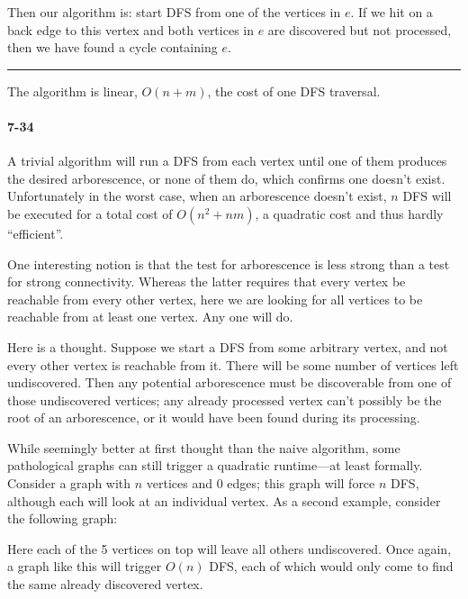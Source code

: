 \documentclass{report}
\newcommand{\okthen}{\rule[-1.4pt]{0.3em}{0.77em}}
\begin{document}
Then our algorithm is: start DFS from one of the vertices in $e$. If we hit on a back edge to this vertex and both vertices in $e$ are discovered but not processed, then we have found a cycle containing $e$.\ \okthen

The algorithm is linear, $O(n+m)$, the cost of one DFS traversal.

\paragraph{7-34} A trivial algorithm will run a DFS from each vertex until one of them produces the desired arborescence, or none of them do, which confirms one doesn't exist. Unfortunately in the worst case, when an arborescence doesn't exist, $n$ DFS will be executed for a total cost of $O(n^2+nm)$, a quadratic cost and thus hardly ``efficient''.

One interesting notion is that the test for arborescence is less strong than a test for strong connectivity. Whereas the latter requires that every vertex be reachable from every other vertex, here we are looking for all vertices to be reachable from at least one vertex. Any one will do.

Here is a thought. Suppose we start a DFS from some arbitrary vertex, and not every other vertex is reachable from it. There will be some number of vertices left undiscovered. Then any potential arborescence must be discoverable from one of those undiscovered vertices; any already processed vertex can't possibly be the root of an arborescence, or it would have been found during its processing.

While seemingly better at first thought than the naive algorithm, some pathological graphs can still trigger a quadratic runtime---at least formally. Consider a graph with $n$ vertices and 0 edges; this graph will force $n$ DFS, although each will look at an individual vertex. As a second example, consider the following graph:
\begin{center}
\end{center}
Here each of the 5 vertices on top will leave all others undiscovered. Once again, a graph like this will trigger $O(n)$ DFS, each of which would only come to find the same already discovered vertex.
\end{document}
